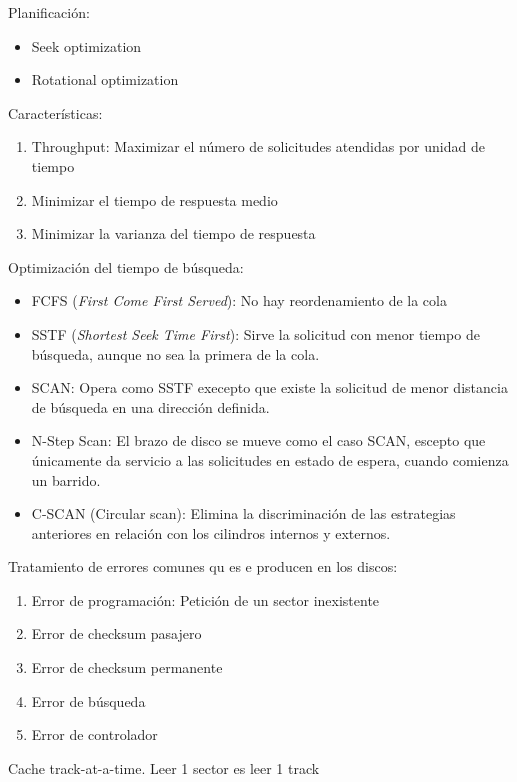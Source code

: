 \documentclass[10pt,portrait, twocolumn]{article}
\begin{document}
Planificación:
	
	\begin{itemize}
	\item Seek optimization
	\item Rotational optimization
	\end{itemize}
	
Características:
	\begin{enumerate}
	\item Throughput: Maximizar el número de solicitudes atendidas por unidad de tiempo
	\item Minimizar el tiempo de respuesta medio
	\item Minimizar la varianza del tiempo de respuesta
	\end{enumerate}
 
 Optimización del tiempo de búsqueda:
 
 	\begin{itemize}
	\item FCFS (\textit{First Come First Served}): No hay reordenamiento de la cola
	\item SSTF (\textit{Shortest Seek Time First}): Sirve la solicitud con menor tiempo de búsqueda, aunque no sea la primera de la cola.
	\item SCAN: Opera como SSTF execepto que existe la solicitud de menor distancia de búsqueda en una dirección definida.
	\item N-Step Scan: El brazo de disco se mueve como el caso SCAN, escepto que únicamente da servicio a las solicitudes en estado de espera, cuando comienza un barrido.
	\item C-SCAN (Circular scan): Elimina la discriminación de las estrategias anteriores en relación con los cilindros internos y externos.
	\end{itemize}
	
Tratamiento de errores comunes qu es e producen en los discos:

	\begin{enumerate}
	\item Error de programación: Petición de un sector inexistente
	\item Error de checksum pasajero
	\item Error de checksum permanente
	\item Error de búsqueda
	\item Error de controlador
	\end{enumerate}
 
 Cache track-at-a-time. Leer 1 sector es leer 1 track
 
\end{document}
